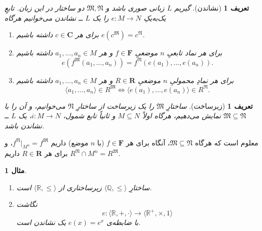 \documentclass[12pt,a4paper]{report}
\theoremstyle{colorhead}
\newtheorem{mesal}[thm]{مثال}
\newtheorem{defn}[thm]{تعریف}
\begin{document}
\begin{defn}[نشاندن]
\label{neshandan}
گیریم
$L$
زبانی صوری باشد و
$\mathfrak{M},\mathfrak{N}$
دو ساختار در این زبان.  تابعِ یک‌به‌یکِ
$e:M\to N$
را یک
$L$ ــ
\textit{نشاندن}
 می‌خوانیم هرگاه 
\begin{enumerate}
\item 
برای هر
$c\in \mathbf{C}$
داشته باشیم
$e(c^\mathfrak{M})=c^\mathfrak{N}$.
\item 
برای هر نماد تابعیِ
$n$ 
موضعیِ
$f\in \mathbf{F}$
و
هر
$a_1,\ldots, a_n\in M$
داشته باشیم
\[
e(f^\mathfrak{M}(a_1,\ldots, a_n))=f^\mathfrak{N}(e(a_1),\ldots,e(a_n)).
\]
\item 
برای هر نمادِ‌ محمولیِ
$n$
موضعیِ
$R\in \mathbf{R}$
و هر
$a_1,\ldots,a_n\in M$
داشته باشیم
\[
\langle a_1,\ldots,a_n\rangle\in R^\mathfrak{M} \Leftrightarrow 
\langle e(a_1),\ldots,e(a_n)\rangle\in R^\mathfrak{N}.
\]
\end{enumerate}
\end{defn}
\begin{defn}[زیرساخت]
ساختارِ
$\mathfrak{M}$
را یک
 زیرساخت
 از ساختارِ
 $\mathfrak{N}$
 می‌خوانیم، و آن را با
 $\mathfrak{M}\subseteq \mathfrak{N}$
 نمایش می‌دهیم، هرگاه اولاً
 $M\subseteq N$
 و ثانیاً تابع شمول،
 $i:M\to N$،
 یک
 $L$ ــ
 نشاندن باشد. 
\end{defn}
معلوم است که هرگاه
$\mathfrak{M}\subseteq \mathfrak{N}$، 
آنگاه برای هر
$f\in \mathbf{F}$
(با
$n$ موضع)
داریم
$f^\mathfrak{N}|_{M^n}=f^\mathfrak{M}$، 
و برای
هر
$R\in \mathbf{R}$
داریم
$R^\mathfrak{N}\cap M^n=R^\mathfrak{M}$.
\begin{mesal}
\hfill 
\begin{enumerate}
\item 
ساختارِ
$\langle \mathbb{Q},\leq\rangle$
زیرساختاری از
$\langle \mathbb{R},\leq \rangle$
است. 
\item
نگاشت
\[
e:\langle \mathbb{R},+,\cdot\rangle\to \langle \mathbb{R}^+,\times,1\rangle
\]
با ضابطه‌ی
$e(x)=e^x$
یک نشاندن است. 
\end{enumerate}
\end{mesal}
\end{document}
